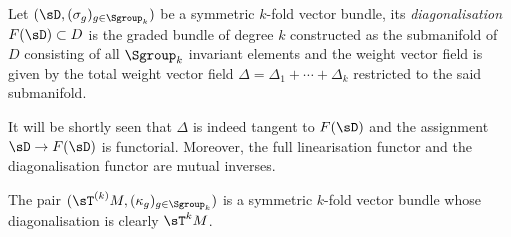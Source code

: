 \begin{Definition}
Let $(\sD, (\sigma_g)_{g\in \Sgroup_k})$ be a symmetric $k$-fold vector bundle, its \emph{diagonalisation} $F(\sD) \subset D$ is the graded bundle of degree $k$ constructed as the submanifold of $D$ consisting of all $\Sgroup_{k}$ invariant elements and the weight vector f\/ield is given by the total weight vector f\/ield $\Delta = \Delta_{1} + \cdots + \Delta_{k}$ restricted to the said submanifold.
\end{Definition}

It will be shortly seen that $\Delta$ is indeed tangent to $F(\sD)$ and the assignment $\sD \to F(\sD)$ is functorial. Moreover, the full linearisation functor and the diagonalisation functor are mutual inverses.

\begin{Example}
The pair $(\sT^{(k)}M, (\kappa_{g})_{g\in \Sgroup_k})$ is a symmetric $k$-fold vector bundle whose diagonalisation is clearly $\sT^{k}M$.
\end{Example}

